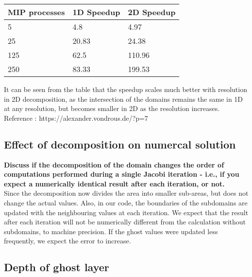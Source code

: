 \documentclass[10pt,a4paper]{article}
\begin{document}
\begin{table}[h]
    \centering
    \begin{tabular}{l|l|l}
    \textbf{MIP processes} & \textbf{1D Speedup} & \textbf{2D Speedup} \\ \hline
    5                      & 4.8             & 4.97            \\ \hline
    25                     & 20.83           & 24.38           \\ \hline
    125                    & 62.5            & 110.96          \\ \hline
    250                    & 83.33           & 199.53          \\
    \end{tabular}
\end{table}

It can be seen from the table that the speedup scales much better with resolution in 2D decomposition, as the 
intersection of the domains remains the same in 1D at any resolution, but becomes smaller in 2D as the resolution 
increases. \\

Reference : https://alexander.vondrous.de/?p=7

\newpage
\subsection{Effect of decomposition on numercal solution}

\textbf{Discuss if the decomposition of the domain changes the order of computations performed during a single Jacobi 
iteration -  i.e., if you expect a numerically identical result after each iteration, or not.} \\

Since the decomposition now divides the area into smaller sub-areas, but does not change the actual values. Also, 
in our code, the boundaries of the subdomains are updated with the neighbouring values at each iteration. We expect 
that the result after each iteration will not be numerically different from the calculation without subdomains, to 
machine precision. If the ghost values were updated less frequently, we expect the error to increase. \\

\subsection{Depth of ghost layer}
\end{document}
